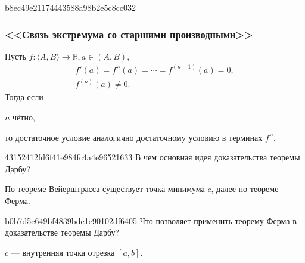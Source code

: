 \begin{note}{b8ec49e21174443588a98b2e5c8cc032}
    \subsubsection{<<Связь экстремума со старшими производными>>}

    Пусть \( f : \langle A, B \rangle \to \mathbb R, a \in (A, B) \),
    \[
        \begin{gathered}
            f'(a) = f''(a) = \cdots = f^{(n - 1)}(a) = 0, \\
            f^{(n)}(a) \neq 0.
        \end{gathered}
    \]
    Тогда если \begin{icloze}{2}\( n \) чётно,\end{icloze} \begin{icloze}{1}то достаточное условие аналогично достаточному условию в терминах \( f'' \).\end{icloze}
\end{note}


\begin{note}{43152412fd6f41e984fc4a4e96521633}
    В чем основная идея доказательства теоремы Дарбу?

    \begin{cloze}{1}
        По теореме Вейерштрасса существует точка минимума \( c \), далее по теореме Ферма.
    \end{cloze}
\end{note}

\begin{note}{b0b7d5c649bf4839bde1e90102df6405}
    Что позволяет применить теорему Ферма в доказательстве теоремы Дарбу?

    \begin{cloze}{1}
        \( c \) --- внутренняя точка отрезка \( [a, b] \).
    \end{cloze}
\end{note}

